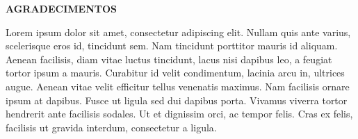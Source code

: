 \begin{newpage}
	\thispagestyle{empty}	
	\setlength{\parindent}{1.25cm} %
	\setlength{\baselineskip}{1.5\baselineskip} %
	\begin{center}
		\textbf{AGRADECIMENTOS} \\ [1.5\baselineskip]
	\end{center}

	Lorem ipsum dolor sit amet, consectetur adipiscing elit. Nullam quis ante varius, scelerisque eros id, tincidunt sem. Nam tincidunt porttitor mauris id aliquam. Aenean facilisis, diam vitae luctus tincidunt, lacus nisi dapibus leo, a feugiat tortor ipsum a mauris. Curabitur id velit condimentum, lacinia arcu in, ultrices augue. Aenean vitae velit efficitur tellus venenatis maximus. Nam facilisis ornare ipsum at dapibus. Fusce ut ligula sed dui dapibus porta. Vivamus viverra tortor hendrerit ante facilisis sodales. Ut et dignissim orci, ac tempor felis. Cras ex felis, facilisis ut gravida interdum, consectetur a ligula.

\end{newpage}
